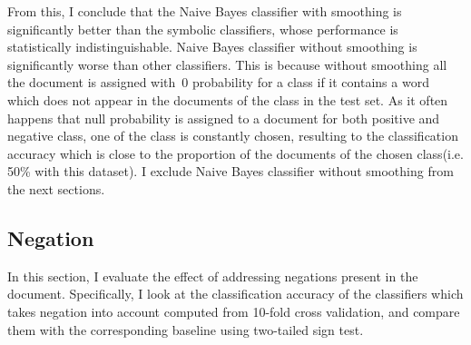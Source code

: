 From this, I conclude that the Naive Bayes classifier with smoothing is significantly better than the symbolic classifiers, whose performance is statistically indistinguishable. Naive Bayes classifier without smoothing is significantly worse than other classifiers. This is because without smoothing all the document is assigned with~$0$ probability for a class if it contains a word which does not appear in the documents of the class in the test set. As it often happens that null probability is assigned to a document for both positive and negative class, one of the class is constantly chosen, resulting to the classification accuracy which is close to the proportion of the documents of the chosen class(i.e. 50\% with this dataset). I exclude Naive Bayes classifier without smoothing from the next sections.
\subsection{Negation}
In this section, I evaluate the effect of addressing negations present in the document. Specifically, I look at the classification accuracy of the classifiers which takes negation into account computed from 10-fold cross validation, and compare them with the corresponding baseline using two-tailed sign test.
